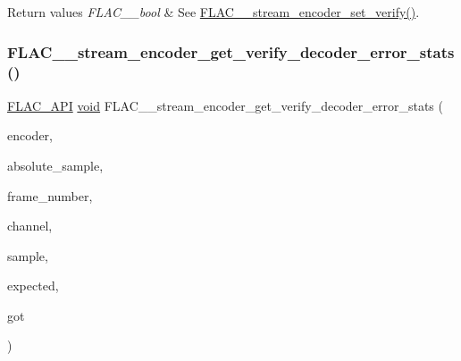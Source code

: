 \begin{DoxyRetVals}{Return values}
{\em F\+L\+A\+C\+\_\+\+\_\+bool} & See \hyperlink{group__flac__stream__encoder_ga5f4ac18a7207d2864fed72d284486f9e}{F\+L\+A\+C\+\_\+\+\_\+stream\+\_\+encoder\+\_\+set\+\_\+verify()}. \\
\hline
\end{DoxyRetVals}
\mbox{\label{group__flac__stream__encoder_ga3e3f5a9267eb998f74caa10865991bd5}} 
\subsubsection{\texorpdfstring{F\+L\+A\+C\+\_\+\+\_\+stream\+\_\+encoder\+\_\+get\+\_\+verify\+\_\+decoder\+\_\+error\+\_\+stats()}{FLAC\_\_stream\_encoder\_get\_verify\_decoder\_error\_stats()}}
{\footnotesize\ttfamily \hyperlink{group__flac__export_ga56ca07df8a23310707732b1c0007d6f5}{F\+L\+A\+C\+\_\+\+A\+PI} \hyperlink{png_8h_ac9c84fa68bbad002983e35ce3663c686}{void} F\+L\+A\+C\+\_\+\+\_\+stream\+\_\+encoder\+\_\+get\+\_\+verify\+\_\+decoder\+\_\+error\+\_\+stats (\begin{DoxyParamCaption}\item[{\hyperlink{zconf_8h_a2c212835823e3c54a8ab6d95c652660e}{const} \hyperlink{struct_f_l_a_c_____stream_encoder}{F\+L\+A\+C\+\_\+\+\_\+\+Stream\+Encoder} $\ast$}]{encoder,  }\item[{\hyperlink{ordinals_8h_aa78c8c70a3eb8a58af7436f278acde8e}{F\+L\+A\+C\+\_\+\+\_\+uint64} $\ast$}]{absolute\+\_\+sample,  }\item[{unsigned $\ast$}]{frame\+\_\+number,  }\item[{unsigned $\ast$}]{channel,  }\item[{unsigned $\ast$}]{sample,  }\item[{\hyperlink{ordinals_8h_a33fd77bfe6d685541a0c034a75deccdc}{F\+L\+A\+C\+\_\+\+\_\+int32} $\ast$}]{expected,  }\item[{\hyperlink{ordinals_8h_a33fd77bfe6d685541a0c034a75deccdc}{F\+L\+A\+C\+\_\+\+\_\+int32} $\ast$}]{got }\end{DoxyParamCaption})}

